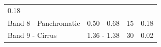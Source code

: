 \documentclass[]{book}
\begin{document}
\begin{longtable}[]{@{}llll@{}}
\begin{minipage}[t]{0.16\columnwidth}
0.18\strut
\end{minipage}\tabularnewline
\begin{minipage}[t]{0.36\columnwidth}\raggedright
Band 8 - Panchromatic\strut
\end{minipage} & \begin{minipage}[t]{0.18\columnwidth}\raggedright
0.50 - 0.68\strut
\end{minipage} & \begin{minipage}[t]{0.19\columnwidth}\raggedright
15\strut
\end{minipage} & \begin{minipage}[t]{0.16\columnwidth}\raggedright
0.18\strut
\end{minipage}\tabularnewline
\begin{minipage}[t]{0.36\columnwidth}\raggedright
Band 9 - Cirrus\strut
\end{minipage} & \begin{minipage}[t]{0.18\columnwidth}\raggedright
1.36 - 1.38\strut
\end{minipage} & \begin{minipage}[t]{0.19\columnwidth}\raggedright
30\strut
\end{minipage} & \begin{minipage}[t]{0.16\columnwidth}\raggedright
0.02\strut
\end{minipage}\tabularnewline
\bottomrule
\end{longtable}
\end{document}
